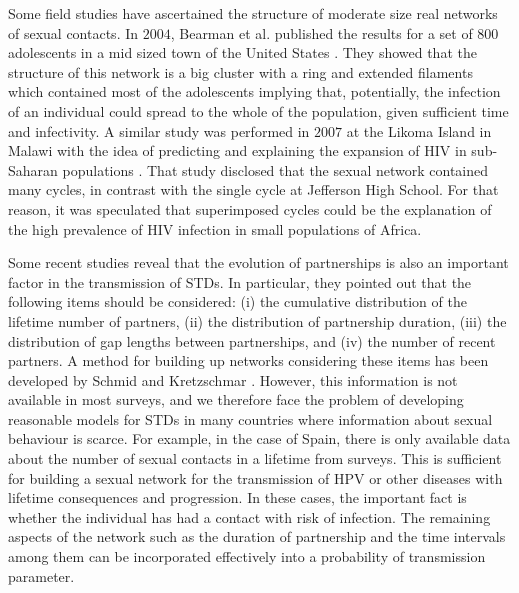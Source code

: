 Some field studies have ascertained the structure of moderate size real networks of sexual contacts. In $2004$, Bearman et al. published the results for a set of $800$ adolescents in a mid sized town of the United States \cite{bearman2004chains}. They  showed that the structure of this network is a big cluster with a ring and extended filaments which contained most of the adolescents implying that, potentially, the infection of an individual could spread to the whole of the population, given sufficient time and infectivity. A similar study was performed in $2007$ at the Likoma Island in Malawi with the idea of predicting and explaining the expansion of HIV in sub-Saharan populations \cite{helleringer2007sexual}. That study disclosed  that the sexual network contained many cycles, in contrast with the single cycle at Jefferson High School. For that reason, it was speculated that superimposed cycles could be the explanation of the high prevalence of HIV infection in small populations of Africa.

Some recent studies reveal that the evolution of partnerships is also an important factor in the transmission of STDs. In particular, they pointed out that the following items should be considered: (i) the cumulative distribution of the lifetime number of partners, (ii) the distribution of partnership duration, (iii) the distribution of gap lengths between partnerships, and (iv) the number of recent partners. A method for building up networks considering these items has been developed by Schmid and Kretzschmar \cite{schmid2012determinants}. However, this information is not available in most surveys, and we therefore face the problem of developing reasonable models for STDs in many countries where information about sexual behaviour is scarce. For example, in the case of Spain, there is only available data about the number of sexual contacts in a lifetime from surveys. This is sufficient for building a sexual network for the transmission of HPV or other diseases with lifetime consequences and progression. In these cases, the important fact is whether the individual has had a contact with risk of infection. The remaining aspects of the network such as the duration of partnership and the time intervals among them can be incorporated effectively into a probability of transmission parameter.


